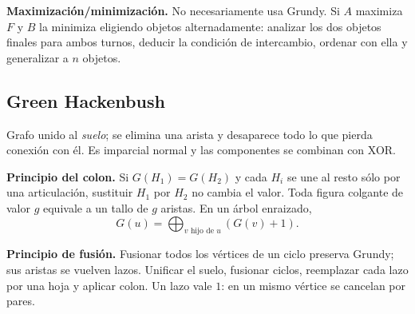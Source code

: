\textbf{Maximización/minimización.} No necesariamente usa Grundy. Si $A$ maximiza $F$ y $B$ la minimiza eligiendo objetos alternadamente: analizar los dos objetos finales para ambos turnos, deducir la condición de intercambio, ordenar con ella y generalizar a $n$ objetos.

\subsection{Green Hackenbush}
Grafo unido al \textit{suelo}; se elimina una arista y desaparece todo lo que pierda conexión con él. Es imparcial normal y las componentes se combinan con XOR.

\textbf{Principio del colon.} Si $G(H_1)=G(H_2)$ y cada $H_i$ se une al resto sólo por una articulación, sustituir $H_1$ por $H_2$ no cambia el valor. Toda figura colgante de valor $g$ equivale a un tallo de $g$ aristas. En un árbol enraizado,
\[
G(u)=\bigoplus_{v\text{ hijo de }u}(G(v)+1).
\]

\textbf{Principio de fusión.} Fusionar todos los vértices de un ciclo preserva Grundy; sus aristas se vuelven lazos. Unificar el suelo, fusionar ciclos, reemplazar cada lazo por una hoja y aplicar colon. Un lazo vale $1$: en un mismo vértice se cancelan por pares.

